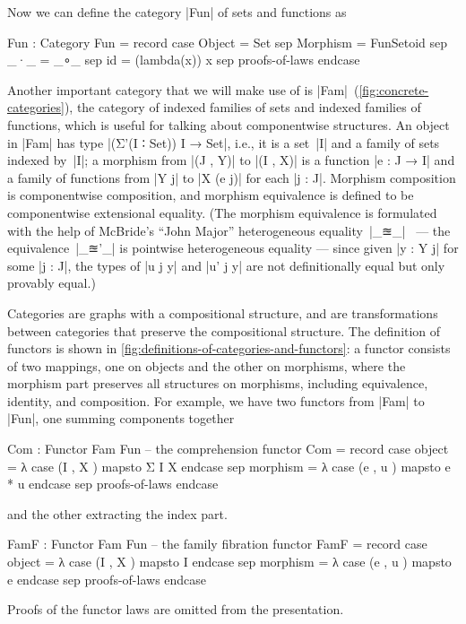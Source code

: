 Now we can define the category |Fun| of sets and functions as
\begin{code}
Fun : Category
Fun = record  case  Object    =  Set
              sep   Morphism  =  FunSetoid
              sep   _·_  =  _∘_
              sep   id   =  (lambda(x)) x
              sep   proofs-of-laws endcase
\end{code}
Another important category that we will make use of is |Fam|~(\autoref{fig:concrete-categories}), the category of indexed families of sets and indexed families of functions, which is useful for talking about componentwise structures.
An object in |Fam| has type |(Σ'(I ∶ Set)) I → Set|, i.e., it is a set~|I| and a family of sets indexed by~|I|;
a morphism from |(J , Y)| to |(I , X)| is a function |e : J → I| and a family of functions from |Y j| to |X (e j)| for each |j : J|.
Morphism composition is componentwise composition, and morphism equivalence is defined to be componentwise extensional equality.
(The morphism equivalence is formulated with the help of McBride's ``John Major'' heterogeneous equality~|_≊_|~\citep{McBride-thesis} --- the equivalence~|_≊'_| is pointwise heterogeneous equality --- since given |y : Y j| for some |j : J|, the types of |u {j} y| and |u' {j} y| are not definitionally equal but only provably equal.)

Categories are graphs with a compositional structure, and  are transformations between categories that preserve the compositional structure.
The definition of functors is shown in \autoref{fig:definitions-of-categories-and-functors}: a functor consists of two mappings, one on objects and the other on morphisms, where the morphism part preserves all structures on morphisms, including equivalence, identity, and composition.
For example, we have two functors from |Fam| to |Fun|, one summing components together
\begin{code}
Com : Functor Fam Fun  -- the comprehension functor
Com = record  case  object    =  λ case (I  ,  X  ) mapsto Σ I X  endcase
              sep   morphism  =  λ case (e  ,  u  ) mapsto e * u  endcase
              sep   proofs-of-laws endcase
\end{code}
and the other extracting the index part.
\begin{code}
FamF : Functor Fam Fun  -- the family fibration functor
FamF = record  case  object    =  λ case (I  ,  X  ) mapsto I  endcase
               sep   morphism  =  λ case (e  ,  u  ) mapsto e  endcase
               sep   proofs-of-laws endcase
\end{code}
Proofs of the functor laws are omitted from the presentation.

